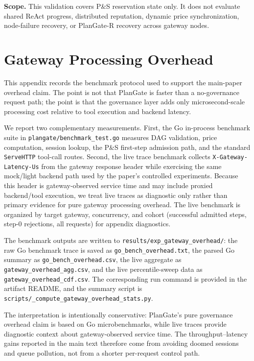 \documentclass[sigconf,anonymous]{acmart}
\begin{document}
\textbf{Scope.} This validation covers P\&S reservation state only. It does not evaluate shared ReAct progress, distributed reputation, dynamic price synchronization, node-failure recovery, or PlanGate-R recovery across gateway nodes.


\section{Gateway Processing Overhead}
\label{sec:gateway_overhead_appendix}

This appendix records the benchmark protocol used to support the main-paper overhead claim. The point is not that PlanGate is faster than a no-governance request path; the point is that the governance layer adds only microsecond-scale processing cost relative to tool execution and backend latency.

We report two complementary measurements. First, the Go in-process benchmark suite in \texttt{plangate/benchmark\_test.go} measures DAG validation, price computation, session lookup, the P\&S first-step admission path, and the standard \texttt{ServeHTTP} tool-call routes. Second, the live trace benchmark collects \texttt{X-Gateway-Latency-Us} from the gateway response header while exercising the same mock/light backend path used by the paper's controlled experiments. Because this header is gateway-observed service time and may include proxied backend/tool execution, we treat live traces as diagnostic only rather than primary evidence for pure gateway processing overhead. The live benchmark is organized by target gateway, concurrency, and cohort (successful admitted steps, step-0 rejections, all requests) for appendix diagnostics.

The benchmark outputs are written to \texttt{results/exp\_gateway\_overhead/}: the raw Go benchmark trace is saved as \texttt{go\_bench\_overhead.txt}, the parsed Go summary as \texttt{go\_bench\_overhead.csv}, the live aggregate as \texttt{gateway\_overhead\_agg.csv}, and the live percentile-sweep data as \texttt{gateway\_overhead\_cdf.csv}. The corresponding run command is provided in the artifact README, and the summary script is \texttt{scripts/\_compute\_gateway\_overhead\_stats.py}.

The interpretation is intentionally conservative: PlanGate's pure governance overhead claim is based on Go microbenchmarks, while live traces provide diagnostic context about gateway-observed service time. The throughput--latency gains reported in the main text therefore come from avoiding doomed sessions and queue pollution, not from a shorter per-request control path.
\end{document}
